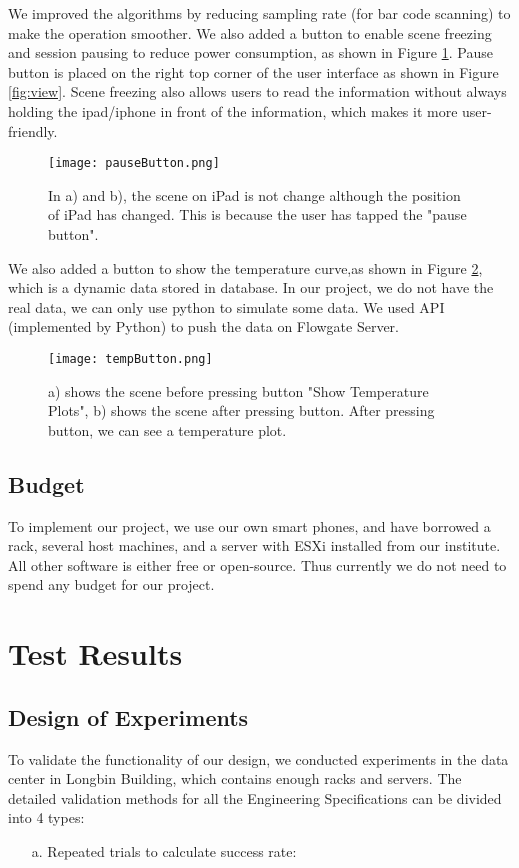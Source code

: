\documentclass[11pt,a4paper]{article}
\begin{document}
\begin{onehalfspace}
\begin{itemize}
We improved the algorithms by reducing sampling rate (for bar code scanning) to make the operation smoother. We also added a button to enable scene freezing and session pausing to reduce power consumption, as shown in Figure \ref{fig:pauseButton}. Pause button is placed on the right top corner of the user interface as shown in Figure \ref{fig:view}. Scene freezing also allows users to read the information without always holding the ipad/iphone in front of the information, which makes it more user-friendly.
\begin{figure}[H]
    \centering
    \texttt{[image: pauseButton.png]}
    \caption{In a) and b), the scene on iPad is not change although the position of iPad has changed. This is because the user has tapped the "pause button".}
    \label{fig:pauseButton}
\end{figure}

We also added a button to show the temperature curve,as shown in Figure \ref{fig:tempPlot}, which is a dynamic data stored in database. In our project, we do not have the real data, we can only use python to simulate some data. We used API (implemented by Python) to push the data on Flowgate Server.
\begin{figure}[H]
    \centering
    \texttt{[image: tempButton.png]}
    \caption{a) shows the scene before pressing button "Show Temperature Plots", b) shows the scene after pressing button. After pressing button, we can see a temperature plot.}
    \label{fig:tempPlot}
\end{figure}


\end{itemize}




\subsection{Budget}
To implement our project, we use our own smart phones, and have borrowed a rack, several host machines, and a server with ESXi installed from our institute. All other software is either free or open-source. Thus currently we do not need to spend any budget for our project.


\section{Test Results}\label{sec: validation}
\subsection{Design of Experiments}
To validate the functionality of our design, we conducted experiments in the data center in Longbin Building, which contains enough racks and servers. The detailed validation methods for all the Engineering Specifications can be divided into 4 types:
\begin{itemize}
    \item[a.] Repeated trials to calculate success rate:
    

\end{itemize}
\end{onehalfspace}
\end{document}
